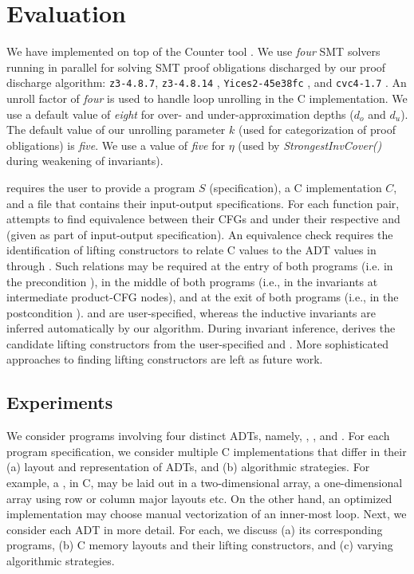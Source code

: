 \chapter{Evaluation}
\label{sec:eval}

We have implemented \toolName{} on top of the Counter tool \cite{oopsla20}.
We use {\em four} SMT solvers running in parallel for solving
SMT proof obligations discharged by our proof discharge algorithm:
{\tt z3-4.8.7}, {\tt z3-4.8.14} \cite{z3}, {\tt Yices2-45e38fc} \cite{yices}, and {\tt cvc4-1.7} \cite{cvc4solver}.
An unroll factor of {\em four} is used to handle loop unrolling in the C implementation.
We use a default value of {\em eight} for over- and under-approximation depths ($d_o$ and $d_u$).
The default value of our unrolling parameter $k$ (used for categorization of proof obligations) is {\em five}.
We use a value of {\em five} for $\eta$ (used by {\em StrongestInvCover()} during weakening of \recursiveRelation{} invariants).

\toolName{} requires the user to provide a \SpecL{} program $S$ (specification), a C implementation $C$,
and a file that contains their input-output specifications.
For each function pair, \toolName{} attempts to find equivalence between their CFGs \sprog{} and \cprog{}
under their respective \pre{} and \post{} (given as part of input-output specification).
An equivalence check requires the identification of lifting constructors to relate C
values to the ADT values in \SpecL{} through  \recursiveRelations{}.
Such relations may be required at the entry of both programs (i.e. in the precondition \pre{}),
in the middle of both programs (i.e., in the invariants at intermediate product-CFG nodes),
and at the exit of both programs (i.e., in the postcondition \post{}).
\pre{} and \post{} are user-specified, whereas the inductive invariants are
inferred automatically by our algorithm.
During invariant inference, \toolName{} derives the candidate lifting constructors
from the user-specified \pre{} and \post{}.
More sophisticated approaches to finding lifting constructors are left as future work.

\section{Experiments}
We consider programs involving four distinct ADTs, namely,
 ,  ,  
and  .
For each \SpecL{} program specification, we consider multiple
C implementations that differ in their (a) layout and representation of ADTs, and
(b) algorithmic strategies. For example, a , in C, may be laid out
in a two-dimensional array, a one-dimensional array using row or column major
layouts etc. On the other hand, an optimized implementation may choose manual vectorization
of an inner-most loop. Next, we consider each ADT in more detail. For each,
we discuss (a) its corresponding programs, (b) C memory layouts and their lifting
constructors, and (c) varying algorithmic strategies.

